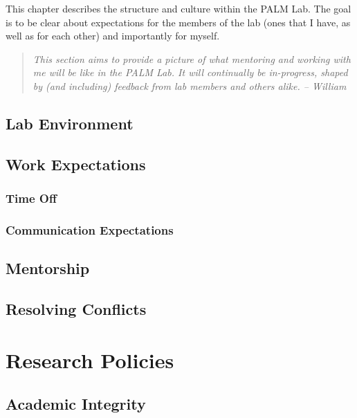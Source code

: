 \documentclass[
]{book}
\begin{document}
This chapter describes the structure and culture within the PALM Lab. The goal is to be clear about expectations for the members of the lab (ones that I have, as well as for each other) and importantly for myself.

\begin{quote}
\emph{This section aims to provide a picture of what mentoring and working with me will be like in the PALM Lab. It will continually be in-progress, shaped by (and including) feedback from lab members and others alike. -- William}
\end{quote}

\hypertarget{lab-environment}{%
\section{Lab Environment}\label{lab-environment}}

\hypertarget{lab-work}{%
\section{Work Expectations}\label{lab-work}}

\hypertarget{lab-timeoff}{%
\subsection{Time Off}\label{lab-timeoff}}

\hypertarget{lab-communication}{%
\subsection{Communication Expectations}\label{lab-communication}}

\hypertarget{lab-mentorship}{%
\section{Mentorship}\label{lab-mentorship}}

\hypertarget{conflicts}{%
\section{Resolving Conflicts}\label{conflicts}}

\hypertarget{research-policies}{%
\chapter{Research Policies}\label{research-policies}}

\hypertarget{academic-integrity}{%
\section{Academic Integrity}\label{academic-integrity}}
\end{document}
